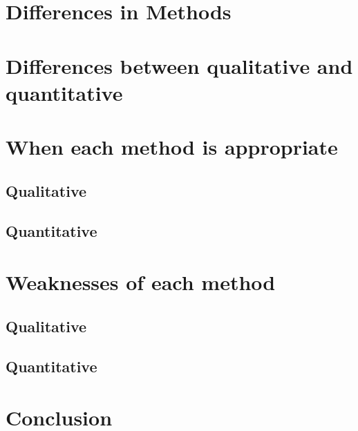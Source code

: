 \documentclass[conference]{IEEEtran}
\begin{document}
\section{Differences in Methods}

\section{Differences between qualitative and quantitative}

\section{When each method is appropriate}

\subsection{Qualitative}

\subsection{Quantitative}

\section{Weaknesses of each method}

\subsection{Qualitative}

\subsection{Quantitative}

\section{Conclusion}



\end{document}
